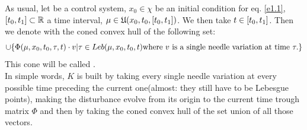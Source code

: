 As usual, let \controlSystem\space be a control system, $x_0\in\chi$ be an initial condition for eq. \eqref{e1.1}, $[t_0,t_1]\subset\mathbb{R}$ a time interval, $\mu\in\mathfrak{U}(x_0,t_0,[t_0,t_1])$. We then take $t\in[t_0,t_1]$. Then we denote with  the coned convex hull of the following set: 
\[ \cup \{ \Phi(\mu,x_0,t_0,\tau,t)\cdot v|\tau\in Leb(\mu,x_0,t_0,t)\text{where $v$ is a single needle variation at time }\tau. \} \]
This cone will be called .\\
In simple words, $K$ is built by taking every single needle variation at every possible time preceding the current one(almost: they still have to be Lebesgue points), making the disturbance evolve from its origin to the current time trough matrix $\Phi$ and then by taking the coned convex hull of the set union of all those vectors. \\
%
%	

